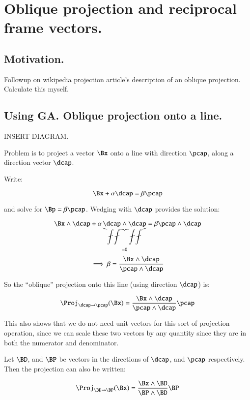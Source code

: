 \chapter{Oblique projection and reciprocal frame vectors.}
\label{chap:obliqueProj}
\date{ May 16, 2008.  $RCSfile: obliqueProj.tex,v $ Last $Revision: 1.20 $ $Date: 2009/06/15 00:48:32 $ }

\section{Motivation. }

Followup on wikipedia projection article's description of an oblique
projection.  Calculate this myself.

\section{Using GA.  Oblique projection onto a line. }

INSERT DIAGRAM.

Problem is to project a vector $\Bx$ onto a line with direction $\pcap$, along a direction vector $\dcap$.

Write:

\begin{equation}\label{eqn:oblique_proj:solveForprojLineUnit}
\Bx + \alpha \dcap = \beta \pcap
\end{equation}

and solve for $\Bp = \beta \pcap$.  Wedging with $\dcap$ provides the solution:

\[
\Bx \wedge \dcap + \alpha \underbrace{\dcap \wedge \dcap}_{=0} = \beta \pcap \wedge \dcap
\]
\[
\implies
\beta = \frac{\Bx \wedge \dcap}{\pcap \wedge \dcap}
\]

So the ``oblique'' projection onto this line (using direction $\dcap$) is:

\begin{equation}
\Proj_{\dcap \rightarrow \pcap}(\Bx) =
\frac{\Bx \wedge \dcap}{\pcap \wedge \dcap} \pcap
\end{equation}

This also shows that we do not need unit vectors for this sort of projection
operation, since we can scale these two vectors by any quantity since they are
in both the numerator and denominator.

Let $\BD$, and $\BP$ be vectors in the directions of $\dcap$, and $\pcap$ respectively.  Then the projection can also be written:

\begin{equation}\label{eqn:oblique_proj:obliqueGAproj}
\Proj_{\BD \rightarrow \BP}(\Bx) =
\frac{\Bx \wedge \BD}{\BP \wedge \BD} \BP
\end{equation}

